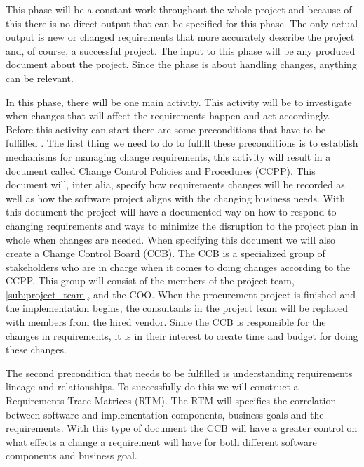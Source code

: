 \documentclass[a4paper]{article}
\begin{document}
This phase will be a constant work throughout the whole project and because of this there is no direct output that can be specified for this phase. The only actual output is new or changed requirements that more accurately describe the project and, of course, a successful project. The input to this phase will be any produced document about the project. Since the phase is about handling changes, anything can be relevant.

In this phase, there will be one main activity. This activity will be to investigate when changes that will affect the requirements happen and act accordingly. Before this activity can start there are some preconditions that have to be fulfilled \cite{gott7}. The first thing we need to do to fulfill these preconditions is to establish mechanisms for managing change requirements, this activity will result in a document called Change Control Policies and Procedures (CCPP). This document will, inter alia, specify how requirements changes will be recorded as well as how the software project aligns with the changing business needs. With this document the project will have a documented way on how to respond to changing requirements and ways to minimize the disruption to the project plan in whole when changes are needed. When specifying this document we will also create a Change Control Board (CCB). The CCB is a specialized group of stakeholders who are in charge when it comes to doing changes according to the CCPP. This group will consist of the members of the project team, \ref{sub:project_team}, and the COO. When the procurement project is finished and the implementation begins, the consultants in the project team will be replaced with members from the hired vendor. Since the CCB is responsible for the changes in requirements, it is in their interest to create time and budget for doing these changes.

The second precondition that needs to be fulfilled is understanding requirements lineage and relationships. To successfully do this we will construct a Requirements Trace Matrices (RTM). The RTM will specifies the correlation between software and implementation components, business goals and the requirements. With this type of document the CCB will have a greater control on what effects a change a requirement will have for both different software components and business goal. 
\end{document}

